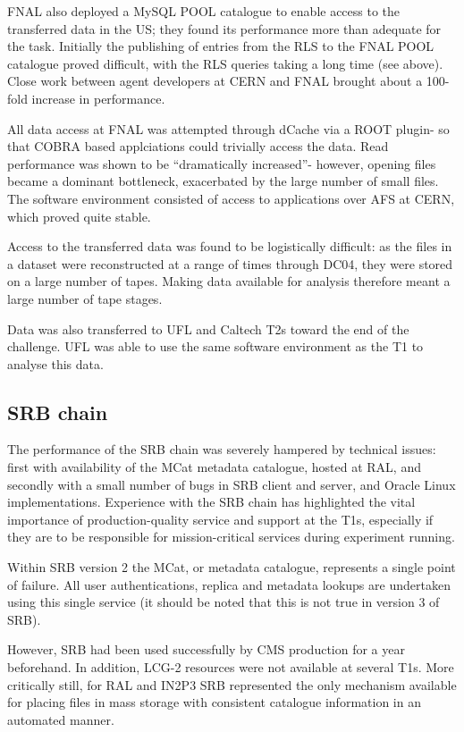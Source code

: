 \documentclass{cmspaper}
\begin{document}
FNAL also deployed a MySQL POOL catalogue to enable access to the
transferred data in the US; they found its performance more than
adequate for the task. Initially the publishing of entries from the
RLS to the FNAL POOL catalogue proved difficult, with the RLS queries
taking a long time (see above). Close work between agent developers at
CERN and FNAL brought about a 100-fold increase in performance.

All data access at FNAL was attempted through dCache via a ROOT
plugin- so that COBRA based applciations could trivially access the
data. Read performance was shown to be ``dramatically increased''-
however, opening files became a dominant bottleneck, exacerbated by
the large number of small files. The software environment consisted of
access to applications over AFS at CERN, which proved quite stable.

Access to the transferred data was found to be logistically difficult:
as the files in a dataset were reconstructed at a range of times
through DC04, they were stored on a large number of tapes. Making data
available for analysis therefore meant a large number of tape stages.

Data was also transferred to UFL and Caltech T2s toward the end of the
challenge. UFL was able to use the same software environment as the T1
to analyse this data.

\subsection{SRB chain}
The performance of the SRB chain was severely hampered by technical
issues: first with availability of the MCat metadata catalogue, hosted
at RAL, and secondly with a small number of bugs in SRB client and
server, and Oracle Linux implementations. Experience with the SRB
chain has highlighted the vital importance of production-quality
service and support at the T1s, especially if they are to be
responsible for mission-critical services during experiment running.

Within SRB version 2 the MCat, or metadata catalogue, represents a
single point of failure. All user authentications, replica and
metadata lookups are undertaken using this single service (it should
be noted that this is not true in version 3 of SRB).

However, SRB had been used successfully by CMS production for a year
beforehand.  In addition, LCG-2 resources were not available at
several T1s. More critically still, for RAL and IN2P3 SRB represented
the only mechanism available for placing files in mass storage with
consistent catalogue information in an automated manner.
\end{document}
